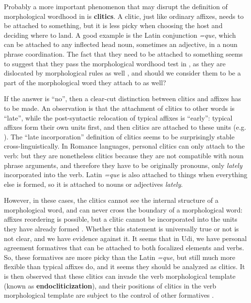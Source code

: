 \documentclass[a4paper, oneside, scheme=plain, 12pt]{article}
\newcommand*{\citepage}[1]{p.~{#1}}
\newcommand*{\concept}[1]{\textbf{#1}}
\newcommand{\form}[1]{\emph{#1}}
\begin{document}
Probably a more important phenomenon that may disrupt the definition of morphological wordhood in  is \concept{clitics}.
A clitic, just like ordinary affixes, needs to be attached to something,
but it is less picky when choosing the host and deciding where to land.
A good example is the Latin conjunction \form{=que},
which can be attached to any inflected head noun,
sometimes an adjective, in a noun phrase coordination.
The fact that they need to be attached to something
seems to suggest that they pass the morphological wordhood test in ,
as they are dislocated by morphological rules as well \citep{harley1999distributed},
and should we consider them to be a part of the morphological word they attach to as well?

If the answer is ``no'', then a clear-cut distinction between clitics and affixes has to be made.
An observation is that the attachment of clitics to other words is ``late'',
while the post-syntactic relocation of typical affixes is ``early'':
typical affixes form their own units first, and then clitics are attached to these units
(e.g. \citealt[\citepage{485}]{jacques2021grammar}).
The ``late incorporation'' definition of clitics seems to be surprisingly stable cross-linguistically.
In Romance languages, personal clitics can only attach to the verb:
but they are nonetheless clitics because they are not compatible with noun phrase arguments,
and therefore they have to be originally pronouns,
only \emph{lately} incorporated into the verb.
Latin \form{=que} is also attached to things when everything else is formed,
so it is attached to nouns or adjectives \emph{lately}.

However, in these cases, the clitics cannot see the internal structure of a morphological word,
and can never cross the boundary of a morphological word:
affixes reordering is possible, but a clitic cannot be incorporated into the units they have already formed
\citep{embick2007linearization}.
Whether this statement is universally true or not is not clear,
and we have evidence against it.
It seems that in Udi, we have personal agreement formatives
that can be attached to both focalized elements and verbs.
So, these formatives are more picky than the Latin \form{=que}, but still much more flexible than typical affixes do,
and it seems they should be analyzed as clitics.
It is then observed that these clitics can invade the verb morphological template
(known as \concept{endocliticization}),
and their positions of clitics in the verb morphological template 
are subject to the control of other formatives \citep{harris2000word}.
\end{document}
